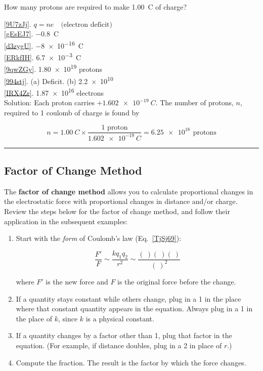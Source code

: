 \documentclass[dvipsnames]{article}
\begin{document}
\begin{example} \label{Se9sG1}
How many protons are required to make \SI{1.00}{C} of charge?
\end{example}

\ref{9U7zJj}. $q = n e \quad \text{(electron deficit)}$\\
\ref{gEsEJ7}. \qty{-0.8}{C}\\
\ref{d3zygU}. \SI{-8e-16}{C}\\
\ref{ERkfIH}. \SI{6.7e-3}{C}\\
\ref{9qwZGy}. \SI{1.80e19}{} protons\\
\ref{994stj}. (a) Deficit. \hspace{1em} (b) \SI{2.2e10}{}\\
\ref{IRX4Zr}. \SI{1.87e16}{} electrons\\

Solution: Each proton carries $+\SI{1.602e-19}{C}$. The number of protons, $n$, required to 1 coulomb of charge is found by

\begin{equation*}
    n = \SI{1.00}{C} \times \frac{\text{1 proton}}{\SI{1.602e-19}{C}} = \SI{6.25e18}{}\,\text{protons}
\end{equation*}


\hrule



\clearpage

\subsection{Factor of Change Method} \label{MeMuHN}

The \textbf{factor of change method} allows you to calculate proportional changes in the electrostatic force with proportional changes in distance and/or charge. Review the steps below for the factor of change method, and follow their application in the subsequent examples:

\begin{enumerate}
\setlength\itemsep{-1ex}
    \item Start with the \textit{form} of Coulomb's law (Eq.~\ref{TjSj69}):

    \begin{equation} \label{GQoZ3E}
        \frac{F'}{F} \sim \frac{k q_1 q_2}{r^2} \sim \frac{(\ )(\ )(\ )}{(\ )^2}
    \end{equation}

    where $F'$ is the new force and $F$ is the original force before the change.
    \item If a quantity stays constant while others change, plug in a 1 in the place where that constant quantity appears in the equation. Always plug in a 1 in the place of $k$, since $k$ is a physical constant.
    \item If a quantity changes by a factor other than 1, plug that factor in the equation. (For example, if distance doubles, plug in a 2 in place of $r$.)
    \item Compute the fraction. The result is the factor by which the force changes.
\end{enumerate}
\end{document}
